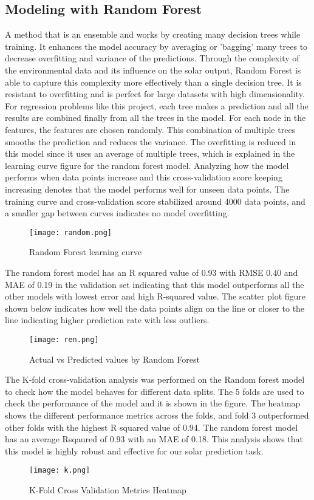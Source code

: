 \documentclass[conference]{IEEEtran}
\begin{document}
\subsection{Modeling with Random Forest}
A method that is an ensemble and works by creating many decision trees while training. It enhances the model accuracy by averaging or 'bagging' many trees to decrease overfitting and variance of the predictions. Through the complexity of the environmental data and its influence on the solar output, Random Forest is able to capture this complexity more effectively than a single decision tree. It is resistant to overfitting and is perfect for large datasets with high dimensionality. For regression problems like this project, each tree makes a prediction and all the results are combined finally from all the trees in the model. For each node in the features, the features are chosen randomly. This combination of multiple trees smooths the prediction and reduces the variance. The overfitting is reduced in this model since it uses an average of multiple trees, which is explained in the learning curve figure for the random forest model. Analyzing how the model performs when data points increase and this cross-validation score keeping increasing denotes that the model performs well for unseen data points. The training curve and cross-validation score stabilized around 4000 data points, and a smaller gap between curves indicates no model overfitting.
\begin{figure}[H] %
    \centering
    \texttt{[image: random.png]}
    \caption{Random Forest learning curve}
    \label{fig: Actual vs Predicted values by SVM}
\end{figure}
The random forest model has an R squared value of 0.93 with RMSE 0.40 and MAE of 0.19 in the validation set indicating that this model outperforms all the other models with lowest error and high R-squared value. The scatter plot figure shown below indicates how well the data points align on the line or closer to the line indicating higher prediction rate with less outliers.
\begin{figure}[H] %
    \centering
    \texttt{[image: ren.png]}
    \caption{Actual vs Predicted values by Random Forest}
    \label{fig: Actual vs Predicted values by SVM}
\end{figure}
The K-fold cross-validation analysis was performed on the Random forest model to check how the model behaves for different data splits. The 5 folds are used to check the performance of the model and it is shown in the figure. The heatmap shows the different performance metrics across the folds, and fold 3 outperformed other folds with the highest R squared value of 0.94.  The random forest model has an average Rsqaured of 0.93 with an MAE of 0.18. This analysis shows that this model is highly robust and effective for our solar prediction task.
\begin{figure}[H] %
    \centering
    \texttt{[image: k.png]}
    \caption{K-Fold Cross Validation Metrics Heatmap}
    \label{fig: Actual vs Predicted values by SVM}
\end{figure}
\end{document}
